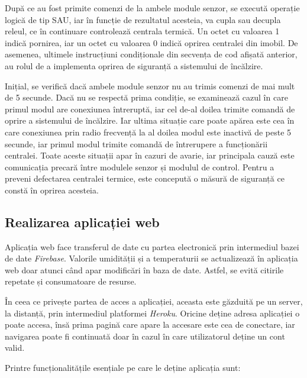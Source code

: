 	După ce au fost primite comenzi de la ambele module senzor, se execută operație logică de tip SAU, iar în funcție de rezultatul acesteia, va cupla sau decupla releul, ce în continuare controlează centrala termică. Un octet cu valoarea 1 indică pornirea, iar un octet cu valoarea 0 indică oprirea centralei din imobil. De asemenea, ultimele instrucțiuni condiționale din secvența de cod afișată anterior, au rolul de a implementa oprirea de siguranță a sistemului de încălzire. 

	Inițial, se verifică dacă ambele module senzor nu au trimis comenzi de mai mult de 5 secunde. Dacă nu se respectă prima condiție, se examinează cazul în care primul modul are conexiunea întreruptă, iar cel de-al doilea trimite comandă de oprire a sistemului de încălzire. Iar ultima situație care poate apărea este cea în care conexiunea prin radio frecvență la al doilea modul este inactivă de peste 5 secunde, iar primul modul trimite comandă de întrerupere a funcționării centralei. Toate aceste situații apar în cazuri de avarie, iar principala cauză este comunicația precară între modulele senzor și modulul de control. Pentru a preveni defectarea centralei termice, este concepută o măsură de siguranță ce constă în oprirea acesteia.  

\subsection{Realizarea aplicației web}

	Aplicația web face transferul de date cu partea electronică prin intermediul bazei de date \textit{Firebase}. Valorile umidității și a temperaturii se actualizează în aplicația web doar atunci când apar modificări în baza de date. Astfel, se evită citirile repetate și consumatoare de resurse.
	
	În ceea ce privește partea de acces a aplicației, aceasta este găzduită pe un server, la distanță, prin intermediul platformei \textit{Heroku}. Oricine deține adresa aplicației o poate accesa, însă prima pagină care apare la accesare este cea de conectare, iar navigarea poate fi continuată doar în cazul în care utilizatorul deține un cont valid. 
	
\vspace{1em}
	Printre funcționalitățile esențiale pe care le deține aplicația sunt:

